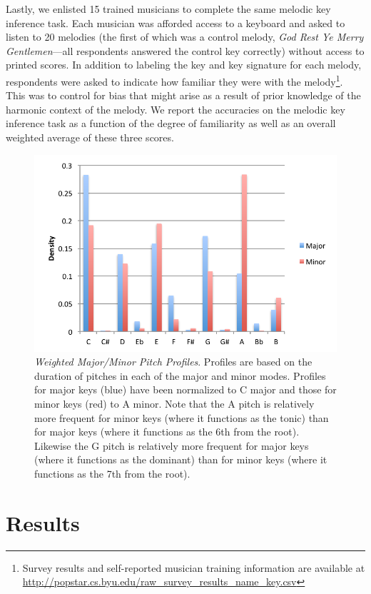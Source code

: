 \documentclass[letterpaper]{article}
\begin{document}
Lastly, we enlisted 15 trained musicians to complete the same melodic key inference task. Each musician was afforded access to a keyboard and asked to listen to 20 melodies (the first of which was a control melody, \emph{God Rest Ye Merry Gentlemen}---all respondents answered the control key correctly) without access to printed scores. In addition to labeling the key and key signature for each melody, respondents were asked to indicate how familiar they were with the melody\footnote{Survey results and self-reported musician training information are available at \url{http://popstar.cs.byu.edu/raw_survey_results_name_key.csv}}. This was to control for bias that might arise as a result of prior knowledge of the harmonic context of the melody. We report the accuracies on the melodic key inference task as a function of the degree of familiarity as well as an overall weighted average of these three scores.

\begin{figure}
  \centering
 \includegraphics[width=.5\textwidth]{./PitchProfilesWeighted.pdf}
  \caption{\emph{Weighted Major/Minor Pitch Profiles}. Profiles are based on the duration of pitches in each of the major and minor modes. Profiles for major keys (blue) have been normalized to C major and those for minor keys (red) to A minor. Note that the A pitch is relatively more frequent for minor keys (where it functions as the tonic) than for major keys (where it functions as the 6th from the root). Likewise the G pitch is relatively more frequent for major keys (where it functions as the dominant) than for minor keys (where it functions as the 7th from the root).}
  \label{fig:pitch_profiles}
\end{figure}

\section{Results}
\end{document}
